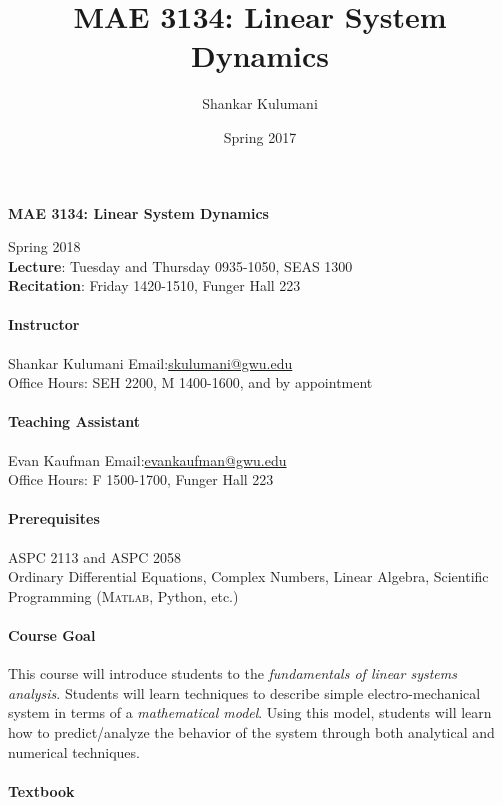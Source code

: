 \documentclass[11pt, reqno]{article}   	%
\title{MAE 3134: Linear System Dynamics}
\author{Shankar Kulumani}
\date{Spring 2017}							%
\begin{document}
{\noindent\Large \textbf{MAE 3134: Linear System Dynamics}}

Spring 2018\\
\textbf{Lecture}: Tuesday and Thursday 0935-1050, SEAS 1300\\
\textbf{Recitation}: Friday 1420-1510, Funger Hall 223
\paragraph{Instructor}
\begin{minipage}[t]{0.8\textwidth}
Shankar Kulumani \quad Email:\href{mailto:skulumani@gwu.edu}{skulumani@gwu.edu}\\
Office Hours: SEH 2200, M 1400-1600, and by appointment
\end{minipage}

\paragraph{Teaching Assistant}
\begin{minipage}[t]{0.8\textwidth}
Evan Kaufman \quad Email:\href{mailto:evankaufman@gwu.edu}{evankaufman@gwu.edu}\\
Office Hours: F 1500-1700, Funger Hall 223
\end{minipage}

\paragraph{Prerequisites}
\begin{minipage}[t]{0.8\textwidth}
ASPC 2113 and ASPC 2058\\
Ordinary Differential Equations, Complex Numbers, Linear Algebra, Scientific Programming (\textsc{Matlab}, Python, etc.)
\end{minipage}

\paragraph{Course Goal} 
This course will introduce students to the \textit{fundamentals of linear systems analysis}.
Students will learn techniques to describe simple electro-mechanical system in terms of a \textit{mathematical model}.
Using this model, students will learn how to predict/analyze the behavior of the system through both analytical and numerical techniques.

\paragraph{Textbook}
\end{document}
